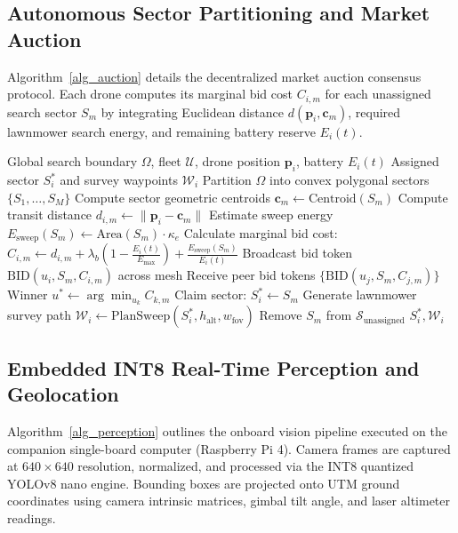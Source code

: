 \documentclass[journal]{IEEEtran}
\begin{document}
\subsection{Autonomous Sector Partitioning and Market Auction}
Algorithm~\ref{alg_auction} details the decentralized market auction consensus protocol. Each drone computes its marginal bid cost $C_{i,m}$ for each unassigned search sector $S_m$ by integrating Euclidean distance $d(\mathbf{p}_i, \mathbf{c}_m)$, required lawnmower search energy, and remaining battery reserve $E_i(t)$.

\begin{algorithm}[!t]
\caption{Decentralized Market Auction Sector Allocation}
\label{alg_auction}
\begin{algorithmic}[1]
\REQUIRE Global search boundary $\Omega$, fleet $\mathcal{U}$, drone position $\mathbf{p}_i$, battery $E_i(t)$
\ENSURE Assigned sector $S_i^*$ and survey waypoints $\mathcal{W}_i$
\STATE Partition $\Omega$ into convex polygonal sectors $\{S_1, \dots, S_M\}$
\STATE Compute sector geometric centroids $\mathbf{c}_m \leftarrow \text{Centroid}(S_m)$
    \STATE Compute transit distance $d_{i,m} \leftarrow \|\mathbf{p}_i - \mathbf{c}_m\|$
    \STATE Estimate sweep energy $E_{\text{sweep}}(S_m) \leftarrow \text{Area}(S_m) \cdot \kappa_e$
    \STATE Calculate marginal bid cost:
    \STATE \quad $C_{i,m} \leftarrow d_{i,m} + \lambda_b \left(1 - \frac{E_i(t)}{E_{\max}}\right) + \frac{E_{\text{sweep}}(S_m)}{E_i(t)}$
    \STATE Broadcast bid token $\text{BID}(u_i, S_m, C_{i,m})$ across mesh
\ENDFOR
\STATE Receive peer bid tokens $\{\text{BID}(u_j, S_m, C_{j,m})\}$
    \STATE Winner $u^* \leftarrow \arg\min_{u_k} C_{k,m}$
        \STATE Claim sector: $S_i^* \leftarrow S_m$
        \STATE Generate lawnmower survey path $\mathcal{W}_i \leftarrow \text{PlanSweep}(S_i^*, h_{\text{alt}}, w_{\text{fov}})$
        \STATE Remove $S_m$ from $\mathcal{S}_{\text{unassigned}}$
    \ENDIF
\ENDFOR
\RETURN $S_i^*, \mathcal{W}_i$
\end{algorithmic}
\end{algorithm}

\subsection{Embedded INT8 Real-Time Perception and Geolocation}
Algorithm~\ref{alg_perception} outlines the onboard vision pipeline executed on the companion single-board computer (Raspberry Pi 4). Camera frames are captured at $640 \times 640$ resolution, normalized, and processed via the INT8 quantized YOLOv8 nano engine. Bounding boxes are projected onto UTM ground coordinates using camera intrinsic matrices, gimbal tilt angle, and laser altimeter readings.
\end{document}
